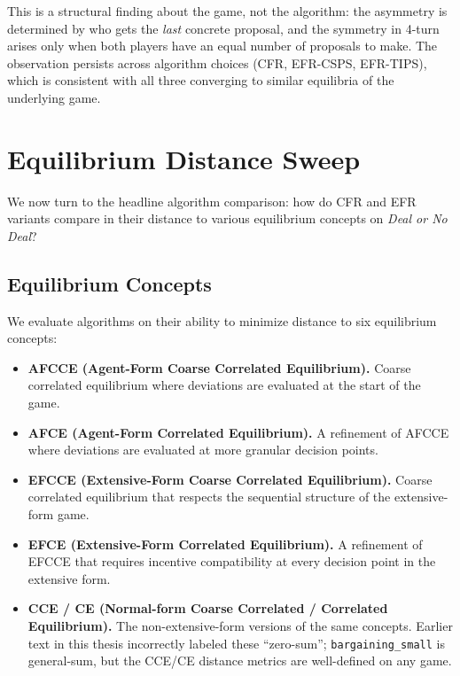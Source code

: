 \documentclass[11pt]{article}
\begin{document}
This is a structural finding about the game, not the algorithm: the asymmetry is determined by who gets the \emph{last} concrete proposal, and the symmetry in 4-turn arises only when both players have an equal number of proposals to make. The observation persists across algorithm choices (CFR, EFR-CSPS, EFR-TIPS), which is consistent with all three converging to similar equilibria of the underlying game.

\section{Equilibrium Distance Sweep}
\label{sec:eqdist}

We now turn to the headline algorithm comparison: how do CFR and EFR variants compare in their distance to various equilibrium concepts on \emph{Deal or No Deal}?

\subsection{Equilibrium Concepts}
\label{sec:eqconcepts}

We evaluate algorithms on their ability to minimize distance to six equilibrium concepts:

\begin{itemize}
    \item \textbf{AFCCE (Agent-Form Coarse Correlated Equilibrium).} Coarse correlated equilibrium where deviations are evaluated at the start of the game.
    \item \textbf{AFCE (Agent-Form Correlated Equilibrium).} A refinement of AFCCE where deviations are evaluated at more granular decision points.
    \item \textbf{EFCCE (Extensive-Form Coarse Correlated Equilibrium).} Coarse correlated equilibrium that respects the sequential structure of the extensive-form game.
    \item \textbf{EFCE (Extensive-Form Correlated Equilibrium).} A refinement of EFCCE that requires incentive compatibility at every decision point in the extensive form.
    \item \textbf{CCE / CE (Normal-form Coarse Correlated / Correlated Equilibrium).} The non-extensive-form versions of the same concepts. Earlier text in this thesis incorrectly labeled these ``zero-sum''; \texttt{bargaining\_small} is general-sum, but the CCE/CE distance metrics are well-defined on any game.
\end{itemize}
\end{document}
